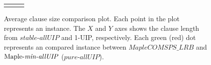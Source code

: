 \documentclass[runningheads]{llncs}
\newcommand{\allUip}{\textit{stable-allUIP}}
\newcommand{\allUipPure}{\textit{pure-allUIP}\xspace}
\newcommand{\allUipMin}{\textit{min-allUIP}\xspace}
\newcommand{\MapleBase}{\textit{MapleCOMSPS\_LRB}}
\newcommand{\MapleIUIPPure}{\text{Maple-\allUipPure}}
\newcommand{\MapleIUIMin}{\text{Maple-\allUipMin}}
\newcommand{\nf}[1]{{\color{red}{#1}}}
\begin{document}
\begin{figure}[t!]
{\begin{tabular}[t]{l c l}
\begin{minipage}[t]{0.5\textwidth}
    \caption{Average clause size comparison plot. Each point in the
      plot represents an instance. The $X$ and $Y$ axes shows the clause
      length from $\allUip$ and 1-UIP, respectively. Each green (red)
      dot represents an compared instance between $\MapleBase$ and
      $\MapleIUIMin$ ($\allUipPure$).}
      \label{fig:len_compare}
  \end{minipage}

\end{tabular}
}
\end{figure}



\end{document}
